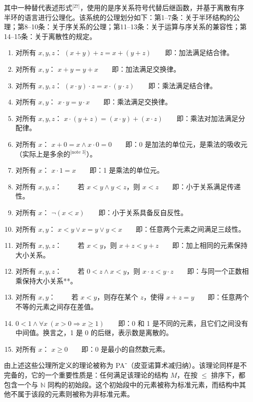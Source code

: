 其中一种替代表述形式\(^\text{[27]}\)，使用的是序关系符号代替后继函数，并基于离散有序半环的语言进行公理化。该系统的公理划分如下：第1–7条：关于半环结构的公理；第8–10条：关于序关系的公理；第11–13条：关于运算与序关系的兼容性；第14–15条：关于离散性的规定。
\begin{enumerate}
\item 对所有 $x, y, z$：
$(x + y) + z = x + (y + z)$  即：加法满足结合律。
\item 对所有 $x, y$：
$x + y = y + x$  即：加法满足交换律。
\item 对所有 $x, y, z$：
$(x \cdot y) \cdot z = x \cdot (y \cdot z)$  即：乘法满足结合律。
\item 对所有 $x, y$：
$x \cdot y = y \cdot x$  即：乘法满足交换律。
\item 对所有 $x, y, z$：
$x \cdot (y + z) = (x \cdot y) + (x \cdot z)$  即：乘法对加法满足分配律。
\item 对所有 $x$：
$x + 0 = x \land x \cdot 0 = 0$  即：0 是加法的单位元，是乘法的吸收元（实际上是多余的\(^\text{[note 3]}\)）。
\item 对所有 $x$：
$x \cdot 1 = x$  即：1 是乘法的单位元。
\item 对所有 $x, y, z$：
  若 $x < y \land y < z$，则 $x < z$  即：小于关系满足传递性。
\item 对所有 $x$：
$\lnot(x < x)$  即：小于关系具备反自反性。
\item 对所有 $x, y$：
$x < y \lor x = y \lor y < x$  即：任意两个元素之间满足三歧性。
\item 对所有 $x, y, z$：
  若 $x < y$，则 $x + z < y + z$  即：加上相同的元素保持大小关系。
\item 对所有 $x, y, z$：
  若 $0 < z \land x < y$，则 $x \cdot z < y \cdot z$  即：与同一个正数相乘保持大小关系**。
\item 对所有 $x, y$：
  若 $x < y$，则存在某个 $z$，使得 $x + z = y$  即：任意两个不等的元素之间存在差值。
\item $0 < 1 \land \forall x\ (x > 0 \Rightarrow x \geq 1)$  即：0 和 1 是不同的元素，且它们之间没有中间值。换言之，1 是 0 的后继，表示数是离散的。
\item 对所有 $x$：
$x \geq 0$  即：0 是最小的自然数元素。
\end{enumerate}
由上述这些公理所定义的理论被称为 PA⁻（皮亚诺算术减归纳）。该理论同样是不完备的，它的一个重要性质是：任何满足该理论的结构 $M$，在按 $\leq$ 排序下，都包含一个与 $\mathbb{N}$ 同构的初始段。这个初始段中的元素被称为标准元素，而结构中其他不属于该段的元素则被称为非标准元素。

